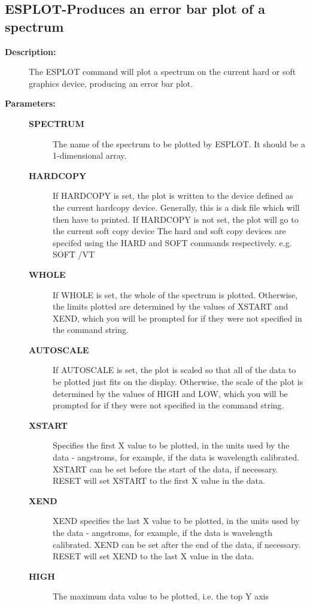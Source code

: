 \begin{description}
\subsection{ESPLOT-\label{ESPLOT}Produces an error bar plot of a spectrum}
\begin{description}

\item [\textbf{Description:}]
 The ESPLOT command will plot a spectrum on the current
 hard or soft graphics device, producing an error bar plot.

\item [\textbf{Parameters:}]
\begin{description}
\item [\textbf{SPECTRUM}]
 The name of the spectrum to be plotted by ESPLOT.
 It should be a 1-dimensional array.
\item [\textbf{HARDCOPY}]
 If HARDCOPY is set, the plot is written to the device
 defined as the current hardcopy device.  Generally, this is
 a disk file which will then have to printed.  If HARDCOPY is
 not set, the plot will go to the current soft copy device
 The hard and soft copy devices are specifed using the HARD
 and SOFT commands respectively.  e.g. SOFT /VT
\item [\textbf{WHOLE}]
 If WHOLE is set, the whole of the spectrum is plotted.
 Otherwise, the limits plotted are determined by the values of
 XSTART and XEND, which you will be prompted for if they were
 not specified in the command string.
\item [\textbf{AUTOSCALE}]
 If AUTOSCALE is set, the plot is scaled so that all of
 the data to be plotted just fits on the display.  Otherwise,
 the scale of the plot is determined by the values of HIGH and
 LOW, which you will be prompted for if they were not specified
 in the command string.
\item [\textbf{XSTART}]
 Specifies the first X value to be plotted, in the
 units used by the data - angstroms, for example, if the data
 is wavelength calibrated.  XSTART can be set before the start
 of the data, if necessary.  RESET will set XSTART to the first
 X value in the data.
\item [\textbf{XEND}]
 XEND specifies the last X value to be plotted, in the units
 used by the data - angstroms, for example, if the data
 is wavelength calibrated.  XEND can be set after the end
 of the data, if necessary.  RESET will set XEND to the last
 X value in the data.
\item [\textbf{HIGH}]
 The maximum data value to be plotted, i.e. the top Y axis

\end{description}
\end{description}
\end{description}
